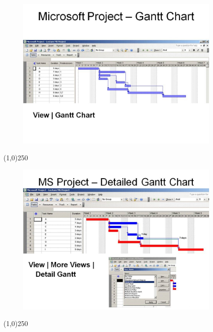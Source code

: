 \begin{frame}
\begin{figure}
	\centering
		\includegraphics[width = 10.0cm]{oldnotes/Slide172.jpg}
\end{figure}
\end{frame}
\begin{center}\line(1,0){250}\end{center}




\begin{frame}
\begin{figure}
	\centering
		\includegraphics[width = 10.0cm]{oldnotes/Slide173.jpg}
\end{figure}
\end{frame}
\begin{center}\line(1,0){250}\end{center}





